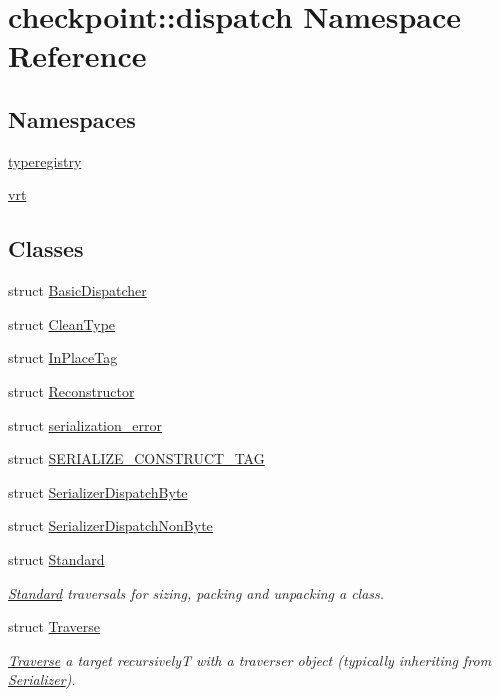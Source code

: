 \hypertarget{namespacecheckpoint_1_1dispatch}{}\section{checkpoint\+:\+:dispatch Namespace Reference}
\label{namespacecheckpoint_1_1dispatch}
\subsection*{Namespaces}
\begin{DoxyCompactItemize}
\item 
 \hyperlink{namespacecheckpoint_1_1dispatch_1_1typeregistry}{typeregistry}
\item 
 \hyperlink{namespacecheckpoint_1_1dispatch_1_1vrt}{vrt}
\end{DoxyCompactItemize}
\subsection*{Classes}
\begin{DoxyCompactItemize}
\item 
struct \hyperlink{structcheckpoint_1_1dispatch_1_1_basic_dispatcher}{Basic\+Dispatcher}
\item 
struct \hyperlink{structcheckpoint_1_1dispatch_1_1_clean_type}{Clean\+Type}
\item 
struct \hyperlink{structcheckpoint_1_1dispatch_1_1_in_place_tag}{In\+Place\+Tag}
\item 
struct \hyperlink{structcheckpoint_1_1dispatch_1_1_reconstructor}{Reconstructor}
\item 
struct \hyperlink{structcheckpoint_1_1dispatch_1_1serialization__error}{serialization\+\_\+error}
\item 
struct \hyperlink{structcheckpoint_1_1dispatch_1_1_s_e_r_i_a_l_i_z_e___c_o_n_s_t_r_u_c_t___t_a_g}{S\+E\+R\+I\+A\+L\+I\+Z\+E\+\_\+\+C\+O\+N\+S\+T\+R\+U\+C\+T\+\_\+\+T\+AG}
\item 
struct \hyperlink{structcheckpoint_1_1dispatch_1_1_serializer_dispatch_byte}{Serializer\+Dispatch\+Byte}
\item 
struct \hyperlink{structcheckpoint_1_1dispatch_1_1_serializer_dispatch_non_byte}{Serializer\+Dispatch\+Non\+Byte}
\item 
struct \hyperlink{structcheckpoint_1_1dispatch_1_1_standard}{Standard}
\begin{DoxyCompactList}\small\item\em \hyperlink{structcheckpoint_1_1dispatch_1_1_standard}{Standard} traversals for sizing, packing and unpacking a class. \end{DoxyCompactList}\item 
struct \hyperlink{structcheckpoint_1_1dispatch_1_1_traverse}{Traverse}
\begin{DoxyCompactList}\small\item\em \hyperlink{structcheckpoint_1_1dispatch_1_1_traverse}{Traverse} a target recursively{\ttfamily T} with a traverser object (typically inheriting from {\ttfamily \hyperlink{structcheckpoint_1_1_serializer}{Serializer}}). \end{DoxyCompactList}\end{DoxyCompactItemize}
